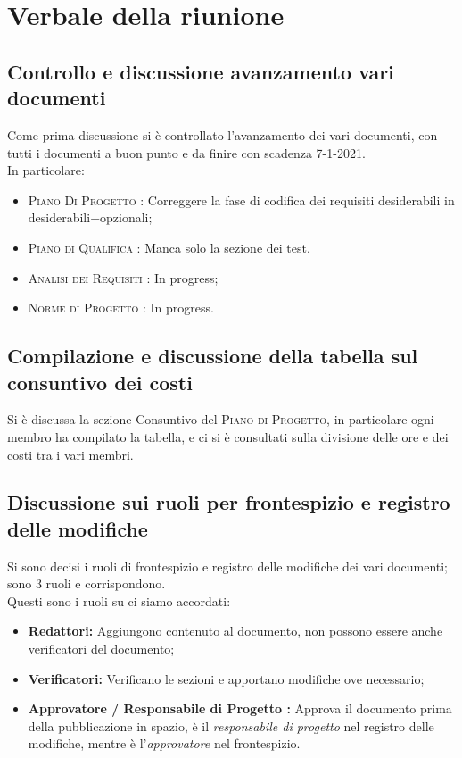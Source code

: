 \section{Verbale della riunione}
\subsection{Controllo e discussione avanzamento vari documenti}
Come prima discussione si è controllato l'avanzamento dei vari documenti, con tutti i documenti a buon punto e da finire con scadenza 7-1-2021.\\
In particolare:
\begin{itemize}
	\item \textsc{Piano Di Progetto :} Correggere la fase di codifica dei requisiti desiderabili in desiderabili+opzionali;
	\item \textsc{Piano di Qualifica :} Manca solo la sezione dei test.
	\item \textsc{Analisi dei Requisiti :} In progress;
	\item \textsc{Norme di Progetto :} In progress.
\end{itemize}

\subsection{Compilazione e discussione della tabella sul consuntivo dei costi}
Si è discussa la sezione Consuntivo del \textsc{Piano di Progetto}, in particolare ogni membro ha compilato la tabella, e ci si è consultati sulla divisione delle ore e dei costi tra i vari membri.

\subsection{Discussione sui ruoli per frontespizio e registro delle modifiche}
Si sono decisi i ruoli di frontespizio e registro delle modifiche dei vari documenti; sono 3 ruoli e corrispondono.\\\newline Questi sono i ruoli su ci siamo accordati:
\begin{itemize}
	\item \textbf{Redattori:} Aggiungono contenuto al documento, non possono essere anche verificatori del documento;
	\item \textbf{Verificatori:} Verificano le sezioni e apportano modifiche ove necessario;
	\item \textbf{Approvatore / Responsabile di Progetto :} Approva il documento prima della pubblicazione in spazio, è il \textit{responsabile di progetto} nel registro delle modifiche, mentre è l'\textit{approvatore} nel frontespizio.
\end{itemize}
\pagebreak
